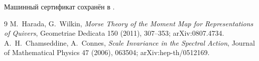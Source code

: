 Машинный сертификат сохранён в
.

\begin{thebibliography}{9}
M.~Harada, G.~Wilkin,
\emph{Morse Theory of the Moment Map for Representations of Quivers},
Geometriae Dedicata 150 (2011), 307--353; arXiv:0807.4734.
A.~H.~Chamseddine, A.~Connes,
\emph{Scale Invariance in the Spectral Action},
Journal of Mathematical Physics 47 (2006), 063504;
arXiv:hep-th/0512169.
\end{thebibliography}
